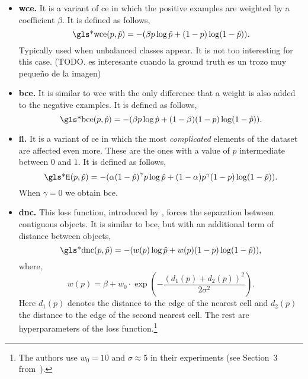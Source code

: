 \begin{itemize}
  \item \textbf{\gls{wce}.} It is a variant of \gls{ce} in which the positive
  examples are weighted by a coefficient \(\beta\). It is defined as follows,
  \begin{equation}
    \text{\gls*{wce}}(p, \hat{p}) =
    -(\beta p\log\hat{p} + (1 - p)\log(1 - \hat{p})).
  \end{equation}
  Typically used when unbalanced classes appear. It is not too interesting for
  this case. (TODO. es interesante cuando la ground truth es un trozo muy
  pequeño de la imagen)
  \item \textbf{\gls{bce}.} It is similar to \gls{wce} with the only difference
  that a weight is also added to the negative examples. It is defined as
  follows,
  \begin{equation}
    \text{\gls*{bce}}(p, \hat{p}) =
    -(\beta p\log\hat{p} + (1 - \beta)(1 - p)\log(1 - \hat{p})).
  \end{equation}
  \item \textbf{\gls{fl}.} It is a variant of \gls{ce} in which the most
  \emph{complicated} elements of the dataset are affected even more. These are
  the ones with a value of \(\hat{p}\) intermediate between \(0\) and \(1\). It
  is defined as follows,
  \begin{equation}
    \text{\gls*{fl}}(p, \hat{p}) =
    -(\alpha {(1 - \hat{p})}^\gamma p\log\hat{p} +
    (1 - \alpha)p^\gamma (1 - p)\log(1 - \hat{p})).
  \end{equation}
  When \(\gamma = 0\) we obtain \gls{bce}.
  \item \textbf{\gls{dnc}.} This loss function, introduced by
  , forces the separation between contiguous
  objects. It is similar to \gls{bce}, but with an additional term of distance
  between objects,
  \begin{equation}
    \text{\gls*{dnc}}(p, \hat{p}) =
    -(w(p)\log\hat{p} + w(p)(1 - p)\log(1 - \hat{p})),
  \end{equation}
  where,
  \begin{equation}
    w(p) = \beta +
    w_0 \cdot \exp\left(-\frac{{(d_1(p) + d_2(p))}^2}{2\sigma^2}\right).
  \end{equation}
  Here \(d_1(p)\) denotes the distance to the edge of the nearest cell and
  \(d_2(p)\) the distance to the edge of the second nearest cell. The rest are
  hyperparameters of the loss function.\footnote{The authors use \(w_0 = 10\)
    and \(\sigma \approx 5\) in their experiments (see Section~3
    from~\cite{ronneberger15:u}).}
\end{itemize}

